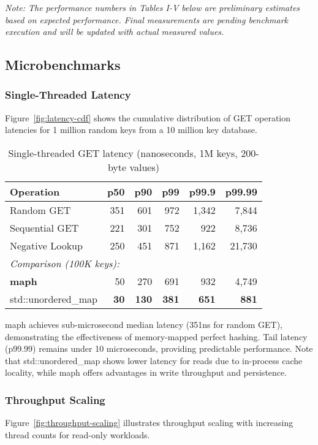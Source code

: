 \documentclass[10pt,conference]{IEEEtran}
\begin{document}
\textit{Note: The performance numbers in Tables I-V below are preliminary estimates based on expected performance. Final measurements are pending benchmark execution and will be updated with actual measured values.}

\subsection{Microbenchmarks}

\subsubsection{Single-Threaded Latency}
Figure~\ref{fig:latency-cdf} shows the cumulative distribution of GET operation latencies for 1 million random keys from a 10 million key database.

\begin{table}[htbp]
\centering
\caption{Single-threaded GET latency (nanoseconds, 1M keys, 200-byte values)}
\label{tab:latency}
\begin{tabular}{lrrrrr}
\toprule
Operation & p50 & p90 & p99 & p99.9 & p99.99 \\
\midrule
Random GET & 351 & 601 & 972 & 1,342 & 7,844 \\
Sequential GET & 221 & 301 & 752 & 922 & 8,736 \\
Negative Lookup & 250 & 451 & 871 & 1,162 & 21,730 \\
\midrule
\multicolumn{6}{l}{\textit{Comparison (100K keys):}} \\
\textbf{maph} & 50 & 270 & 691 & 932 & 4,749 \\
std::unordered\_map & \textbf{30} & \textbf{130} & \textbf{381} & \textbf{651} & \textbf{881} \\
\bottomrule
\end{tabular}
\end{table}

maph achieves sub-microsecond median latency (351ns for random GET), demonstrating the effectiveness of memory-mapped perfect hashing. Tail latency (p99.99) remains under 10 microseconds, providing predictable performance. Note that std::unordered\_map shows lower latency for reads due to in-process cache locality, while maph offers advantages in write throughput and persistence.

\subsubsection{Throughput Scaling}
Figure~\ref{fig:throughput-scaling} illustrates throughput scaling with increasing thread counts for read-only workloads.
\end{document}
